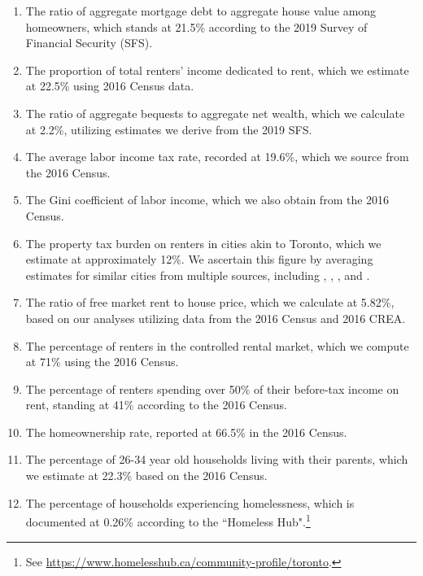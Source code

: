 \documentclass[parskip=full]{article}
\begin{document}
\begin{enumerate}
    \item The ratio of aggregate mortgage debt to aggregate house value among homeowners, which stands at 21.5\% according to the 2019 Survey of Financial Security (SFS).
    \item The proportion of total renters' income dedicated to rent, which we estimate at 22.5\% using 2016 Census data.
    \item The ratio of aggregate bequests to aggregate net wealth, which we calculate at 2.2\%, utilizing estimates we derive from the 2019 SFS.
    \item The average labor income tax rate, recorded at 19.6\%, which we source from the 2016 Census.
    \item The Gini coefficient of labor income, which we also obtain from the 2016 Census.
    \item The property tax burden on renters in cities akin to Toronto, which we estimate at approximately 12\%. We ascertain this figure by averaging estimates for similar cities from multiple sources, including \citet{cy-1994}, \citet{susin-2002}, \citet{fack-2006}, and \citet{sy-2020}.
    \item The ratio of free market rent to house price, which we calculate at 5.82\%, based on our analyses utilizing data from the 2016 Census and 2016 CREA.
    \item The percentage of renters in the controlled rental market, which we compute at 71\% using the 2016 Census. 
    \item The percentage of renters spending over 50\% of their before-tax income on rent, standing at 41\% according to the 2016 Census.
    \item The homeownership rate, reported at 66.5\% in the 2016 Census.
    \item The percentage of 26-34 year old households living with their parents, which we estimate at 22.3\% based on the 2016 Census.
    \item The percentage of households experiencing homelessness, which is documented at 0.26\% according to the ``Homeless Hub".\footnote{See \url{https://www.homelesshub.ca/community-profile/toronto}.}
\end{enumerate}
\end{document}
